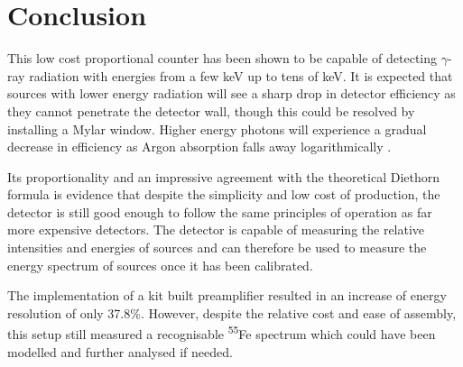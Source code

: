 \chapter{Conclusion}

This low cost proportional counter has been shown to be capable of detecting $\gamma$-ray radiation with energies from a few keV up to tens of keV. It is expected that sources with lower energy radiation will see a sharp drop in detector efficiency as they cannot penetrate the detector wall, though this could be resolved by installing a Mylar window. Higher energy photons will experience a gradual decrease in efficiency as Argon absorption falls away logarithmically \cite{nist}.

Its proportionality and an impressive agreement with the theoretical Diethorn formula is evidence that despite the simplicity and low cost of production, the detector is still good enough to follow the same principles of operation as far more expensive detectors. The detector is capable of measuring the relative intensities and energies of sources and can therefore be used to measure the energy spectrum of sources once it has been calibrated.

The implementation of a kit built preamplifier resulted in an increase of energy resolution of only 37.8\%. However, despite the relative cost and ease of assembly, this setup still measured a recognisable \textsuperscript{55}Fe spectrum which could have been modelled and further analysed if needed.